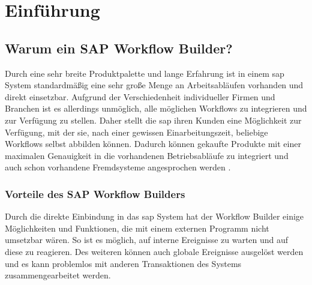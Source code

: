 \section{Einführung}
\subsection{Warum ein SAP Workflow Builder?}
\label{sec:warum-wf-builder}
Durch eine sehr breite Produktpalette und lange Erfahrung ist in einem \gls{sap} System standardmäßig eine sehr große Menge an Arbeitsabläufen vorhanden und direkt einsetzbar. Aufgrund der Verschiedenheit individueller Firmen und Branchen ist es allerdings unmöglich, alle möglichen Workflows zu integrieren und zur Verfügung zu stellen. Daher stellt die \gls{sap} ihren Kunden eine Möglichkeit zur Verfügung, mit der sie, nach einer gewissen Einarbeitungszeit, beliebige Workflows selbst abbilden können. Dadurch können gekaufte Produkte mit einer maximalen Genauigkeit in die vorhandenen Betriebsabläufe zu integriert und auch schon vorhandene Fremdsysteme angesprochen werden \cite{SAPHelpWf}.

\subsubsection{Vorteile des SAP Workflow Builders}
\label{sec:vorteile-sap-wf-builder}
Durch die direkte Einbindung in das \gls{sap} System hat der Workflow Builder einige Möglichkeiten und Funktionen, die mit einem externen Programm nicht umsetzbar wären. So ist es möglich, auf interne Ereignisse zu warten und auf diese zu reagieren. Des weiteren können auch globale Ereignisse ausgelöst werden und es kann problemlos mit anderen Transaktionen des Systems zusammengearbeitet werden. 

